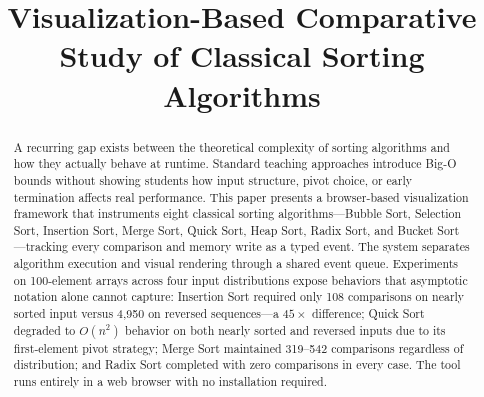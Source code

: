 \documentclass[conference]{IEEEtran}
\begin{document}
\title{Visualization-Based Comparative Study of Classical Sorting Algorithms}

\author{
\and
{}
\and
{}
}

\maketitle

\begin{abstract}
A recurring gap exists between the theoretical complexity of sorting algorithms
and how they actually behave at runtime. Standard teaching approaches introduce
Big-O bounds without showing students how input structure, pivot choice, or
early termination affects real performance. This paper presents a browser-based
visualization framework that instruments eight classical sorting
algorithms---Bubble Sort, Selection Sort, Insertion Sort, Merge Sort, Quick
Sort, Heap Sort, Radix Sort, and Bucket Sort---tracking every comparison and
memory write as a typed event. The system separates algorithm execution and visual
rendering through a shared event queue. Experiments on
100-element arrays across four input distributions expose behaviors that
asymptotic notation alone cannot capture: Insertion Sort required only 108
comparisons on nearly sorted input versus 4,950 on reversed sequences---a
$45\times$ difference; Quick Sort degraded to $O(n^2)$ behavior on both nearly
sorted and reversed inputs due to its first-element pivot strategy; Merge Sort
maintained 319--542 comparisons regardless of distribution; and Radix Sort
completed with zero comparisons in every case. The tool runs entirely in a web
browser with no installation required.
\end{abstract}
\end{document}
